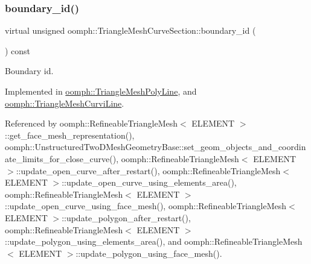 \mbox{\label{classoomph_1_1TriangleMeshCurveSection_a2e6d22017ce7abe7e84e3f16360f5444}} 
\subsubsection{\texorpdfstring{boundary\+\_\+id()}{boundary\_id()}}
{\footnotesize\ttfamily virtual unsigned oomph\+::\+Triangle\+Mesh\+Curve\+Section\+::boundary\+\_\+id (\begin{DoxyParamCaption}{ }\end{DoxyParamCaption}) const\hspace{0.3cm}{\ttfamily [pure virtual]}}



Boundary id. 



Implemented in \hyperlink{classoomph_1_1TriangleMeshPolyLine_af4fa1e14f3e2f8d16e085da928272872}{oomph\+::\+Triangle\+Mesh\+Poly\+Line}, and \hyperlink{classoomph_1_1TriangleMeshCurviLine_acb7ae5fdae67480a0e797da29d518aee}{oomph\+::\+Triangle\+Mesh\+Curvi\+Line}.



Referenced by oomph\+::\+Refineable\+Triangle\+Mesh$<$ E\+L\+E\+M\+E\+N\+T $>$\+::get\+\_\+face\+\_\+mesh\+\_\+representation(), oomph\+::\+Unstructured\+Two\+D\+Mesh\+Geometry\+Base\+::set\+\_\+geom\+\_\+objects\+\_\+and\+\_\+coordinate\+\_\+limits\+\_\+for\+\_\+close\+\_\+curve(), oomph\+::\+Refineable\+Triangle\+Mesh$<$ E\+L\+E\+M\+E\+N\+T $>$\+::update\+\_\+open\+\_\+curve\+\_\+after\+\_\+restart(), oomph\+::\+Refineable\+Triangle\+Mesh$<$ E\+L\+E\+M\+E\+N\+T $>$\+::update\+\_\+open\+\_\+curve\+\_\+using\+\_\+elements\+\_\+area(), oomph\+::\+Refineable\+Triangle\+Mesh$<$ E\+L\+E\+M\+E\+N\+T $>$\+::update\+\_\+open\+\_\+curve\+\_\+using\+\_\+face\+\_\+mesh(), oomph\+::\+Refineable\+Triangle\+Mesh$<$ E\+L\+E\+M\+E\+N\+T $>$\+::update\+\_\+polygon\+\_\+after\+\_\+restart(), oomph\+::\+Refineable\+Triangle\+Mesh$<$ E\+L\+E\+M\+E\+N\+T $>$\+::update\+\_\+polygon\+\_\+using\+\_\+elements\+\_\+area(), and oomph\+::\+Refineable\+Triangle\+Mesh$<$ E\+L\+E\+M\+E\+N\+T $>$\+::update\+\_\+polygon\+\_\+using\+\_\+face\+\_\+mesh().

\mbox{\label{classoomph_1_1TriangleMeshCurveSection_af052734eb3a34089c6ba2c9cfb937bf3}} 
